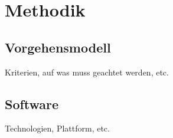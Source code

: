 \chapter{Methodik}

\section{Vorgehensmodell}

Kriterien, auf was muss geachtet werden, etc.

\section{Software}

Technologien, Plattform, etc.
